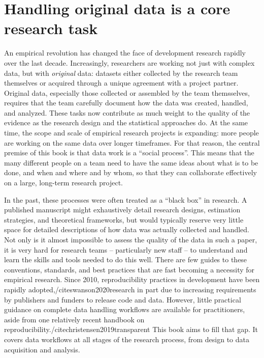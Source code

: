\section{Handling original data is a core research task}

An empirical revolution has changed the face of development research rapidly over the last decade.
Increasingly, researchers are working not just with complex data,
but with \textit{original} data:
datasets either collected by the research team themselves
or acquired through a unique agreement with a project partner.
Original data, especially those collected or assembled by the team themsselves,
requires that the team carefully document how the data was created, handled, and analyzed.
These tasks now contribute as much weight to the quality of the evidence
as the research design and the statistical approaches do.
At the same time, the scope and scale of empirical research projects is expanding:
more people are working on the same data over longer timeframes.
For that reason, the central premise of this book is that data work is a ``social process''.
This means that the many different people on a team need to have the same ideas
about what is to be done, and when and where and by whom,
so that they can collaborate effectively on a large, long-term research project.

In the past, these processes were often treated as a ``black box'' in research.
A published manuscript might exhaustively detail
research designs, estimation strategies, and theoretical frameworks,
but would typically reserve very little space for detailed descriptions
of how data was actually collected and handled.
Not only is it almost impossible to assess the quality of the data in such a paper,
it is very hard for research teams -- particularly new staff --
to understand and learn the skills and tools needed to do this well.
There are few guides to these conventions, standards, and best practices
that are fast becoming a necessity for empirical research.
Since 2010, reproducibility practices in development have been rapidly adopted,/cite{swanson2020research}
in part due to increasing requirements by publishers and funders to release code and data.
However, little practical guidance on complete data handling workflows are available for practitioners,
aside from one relatively recent handbook on reproducibility./cite{christensen2019transparent}
This book aims to fill that gap.
It covers data workflows at all stages of the research process,
from design to data acquisition and analysis.

